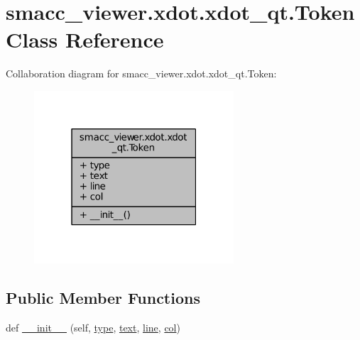 \hypertarget{classsmacc__viewer_1_1xdot_1_1xdot__qt_1_1Token}{}\section{smacc\+\_\+viewer.\+xdot.\+xdot\+\_\+qt.\+Token Class Reference}
\label{classsmacc__viewer_1_1xdot_1_1xdot__qt_1_1Token}


Collaboration diagram for smacc\+\_\+viewer.\+xdot.\+xdot\+\_\+qt.\+Token\+:
\nopagebreak
\begin{figure}[H]
\begin{center}
\leavevmode
\includegraphics[width=211pt]{classsmacc__viewer_1_1xdot_1_1xdot__qt_1_1Token__coll__graph}
\end{center}
\end{figure}
\subsection*{Public Member Functions}
\begin{DoxyCompactItemize}
\item 
def \hyperlink{classsmacc__viewer_1_1xdot_1_1xdot__qt_1_1Token_a14e5962ec2e13a77788b88fc0e75ac3f}{\+\_\+\+\_\+init\+\_\+\+\_\+} (self, \hyperlink{classsmacc__viewer_1_1xdot_1_1xdot__qt_1_1Token_a7fe2400bff8e8afe706b99cd08ed54d2}{type}, \hyperlink{classsmacc__viewer_1_1xdot_1_1xdot__qt_1_1Token_ab91dfc81bcb5ccee85aa2afbdd2458e5}{text}, \hyperlink{classsmacc__viewer_1_1xdot_1_1xdot__qt_1_1Token_a8f80d30cf3992d660761d410f26aacf7}{line}, \hyperlink{classsmacc__viewer_1_1xdot_1_1xdot__qt_1_1Token_a43b911836db7ac4fc9743c063ffc3c22}{col})
\end{DoxyCompactItemize}
